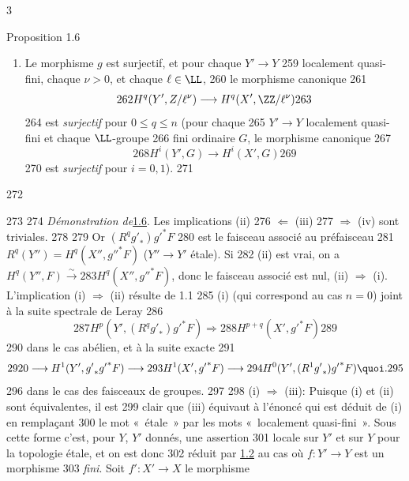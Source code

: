3	\documentclass[10pt]{../fichiers-configuration-latex/smfart}
\begin{document}
\begin{enonce*}{Proposition 1.6}
\begin{enumerate}
   251	ind-$\LL$-groupes) $F$ sur $Y'$, le morphisme
   252	$$
   253	H^{q}(Y',F)\longrightarrow H^{q}(X', {g'}^{\ast}F)
   254	$$
   255	est bijectif si $q\leq n$ et injectif si $q=n+1$ (\resp est bijectif
   256	si $q\leq 1$).
   257	
   258	\item Le morphisme $g$ est surjectif, et pour chaque $Y'\rightarrow Y$
   259	localement quasi-fini, chaque $\nu>0$, et chaque $\ell\in \LL$,
   260	le morphisme canonique
   261	$$
   262	H^{q}(Y',Z/\ell^{\nu})\longrightarrow H^{q}(X', \ZZ/\ell^{\nu})
   263	$$
   264	est \emph{surjectif} pour $0\leq q\leq n$ (\resp pour chaque
   265	$Y'\rightarrow Y$ localement quasi-fini et chaque $\LL$-groupe
   266	fini ordinaire $G$, le morphisme canonique
   267	$$
   268	H^{i}(Y',G)\longrightarrow H^{i}(X', G)
   269	$$
   270	est \emph{surjectif} pour $i=0,1$). 
   271	\end{enumerate}
   272	\end{enonce*}
   273	
   274		\emph{Démonstration de}\pageoriginale \hyperref[XV.prop1.6]{1.6}. Les implications (ii)
   276	$\Leftarrow$ (iii) 
   277	$\Rightarrow$ (iv) sont triviales.
   278	%
   279	Or $(R^{q}{g'}_{\ast}){g'}^{\ast}F$
   280	est le faisceau associé au préfaisceau
   281	$R^{q}(Y'')=H^{q}(X'',{g''}^{\ast}F)$ ($Y''\rightarrow Y'$ étale). Si
   282	(ii) est vrai, on a $H^{q}(Y'',F)\xrightarrow{\sim}
   283	H^{q}(X'',{g''}^{\ast}F)$, donc le faisceau associé est nul, \ie (ii) $\Rightarrow$ (i). L'implication (i) $\Rightarrow$ (ii) résulte de 1.1
   285	(i) (qui correspond au cas $n=0$) joint à la suite spectrale de Leray
   286	$$
   287	H^{p}(Y',(R^{q}{g'}_{\ast}){g'}^{\ast}F)\Longrightarrow
   288	H^{p+q}(X',{g'}^{\ast}F)
   289	$$
   290	dans le cas abélien, et à la suite exacte
   291	$$
   292	0\longrightarrow H^{1}(Y',{g'}_{\ast}{g'}^{\ast}F)\longrightarrow
   293	H^{1}(X',{g'}^{\ast}F)\longrightarrow
   294	H^{0}(Y',(R^{1}{g'}_{\ast}){g'}^{\ast}F){\quoi}.
   295	$$
   296	dans le cas des faisceaux de groupes.
   297	
   298	(i) $\Rightarrow$ (iii): Puisque (i) et (ii) sont équivalentes, il est
   299	clair que (iii) équivaut à l'énoncé qui est déduit de (i) en remplaçant
   300	le mot « étale »  par les mots « localement quasi-fini ». Sous cette forme c'est, pour $Y$, $Y'$ donnés, une assertion
   301	locale sur $Y'$ et sur $Y$ pour la topologie étale, et on est donc
   302	réduit par \hyperref[XV.lem1.2]{1.2} au cas où $f:Y'\rightarrow Y$ est un morphisme
   303	\emph{fini}. Soit $f':X'\rightarrow X$ le morphisme
\end{document}
